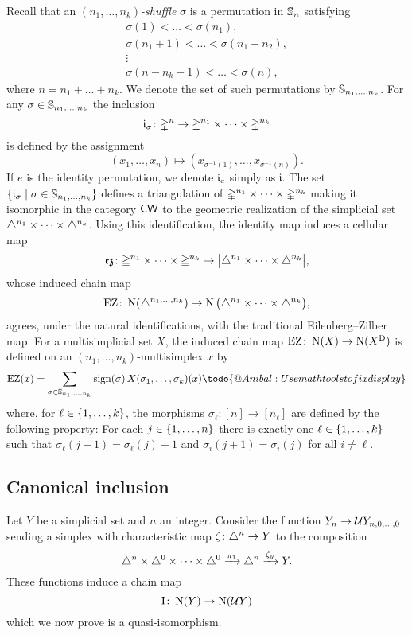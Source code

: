 Recall that an \textit{$(n_1,\dots,n_k)$-shuffle} $\sigma$ is a permutation in $\sym_n$ satisfying
\begin{gather*}
	\sigma(1) < \dots < \sigma(n_1), \\
	\sigma(n_1+1) < \dots < \sigma(n_1+n_2), \\
	\vdots \\
	\sigma(n-n_k-1) < \dots < \sigma(n),
\end{gather*}
where $n = n_1+\dots+n_k$.
We denote the set of such permutations by $\sh_{n_1,\dots,n_k}$.
For any $\sigma \in \sh_{n_1,\dots,n_k}$ the inclusion
\[
\gi_\sigma \colon \gsimplex^n \to \gmsimplex{n_1}{n_k}
\]
is defined by the assignment
\[
(x_1,\dots,x_n) \mapsto (x_{\sigma^{-1}(1)}, \dots, x_{\sigma^{-1}(n)}).
\]
If $e$ is the identity permutation, we denote $\gi_{e}$ simply as $\mathfrak{i}$.
The set $\set{\gi_\sigma \mid \sigma \in \sh_{n_1,\dots,n_k}}$ defines a triangulation of $\gmsimplex{n_1}{n_k}$ making it isomorphic in the category $\CW$ to the geometric realization of the simplicial set $\msimplex{n_1}{n_k}$.
Using this identification, the identity map induces a cellular map
\[
\ez \colon \gmsimplex{n_1}{n_k} \to \bars[\big]{\msimplex{n_1}{n_k}},
\]
whose induced chain map
\[
\EZ \colon \chains(\simplex^{n_1,\dots,n_k}) \to \chains\big(\msimplex{n_1}{n_k}\big),
\]
agrees, under the natural identifications, with the traditional Eilenberg--Zilber map.
For a multisimplicial set $X$, the induced chain map $\EZ \colon \chains(X) \to \chains(X^\diag)$ is defined on an $(n_1,\dots,n_k)$-multisimplex $x$ by
\[
\EZ(x) = \sum_{\sigma \in \sh_{n_1,\dots,n_k}} \sign(\sigma) \, X(\sigma_1 ,\dots, \sigma_k)(x) \todo{@Anibal: Use mathtools to fix display}
\]
where, for $\ell \in \set{1,\dots,k}$, the morphisms $\sigma_\ell \colon [n] \to [n_\ell]$ are defined by the following property: For
each $j \in \set{1,\dots,n}$ there is exactly one $\ell \in \set{1,\dots,k}$ such that $\sigma_\ell(j+1) = \sigma_\ell(j)+1$ and $\sigma_i(j+1) = \sigma_i(j)$ for all $i \neq \ell$.

\subsection{Canonical inclusion}

Let $Y$ be a simplicial set and $n$ an integer.
Consider the function $Y_n \to \cU Y_{n,0,\dots,0}$ sending a simplex with characteristic map $\zeta \colon \simplex^n \to Y$ to the composition
\[
\simplex^n \times \msimplex{0}{0} \xra{\pi_1} \simplex^n \xra{\zeta_y} Y.
\]
These functions induce a chain map
\[
\In \colon \chains(Y) \to \chains(\cU Y)
\]
which we now prove is a quasi-isomorphism.